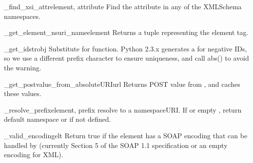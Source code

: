 \begin{funcdesc}{_find_xsi_attr}{element, attribute}
Find the attribute in any of the XMLSchema namespaces.
\end{funcdesc}

\begin{funcdesc}{_get_element_nsuri_name}{element}
Returns a  tuple representing the element tag.
\end{funcdesc}

\begin{funcdesc}{_get_idstr}{obj}
Substitute for  function.  Python 2.3.x generates a  for negative
IDs, so we use a different prefix character to ensure uniqueness, and call abs()
to avoid the warning.
\end{funcdesc}

\begin{funcdesc}{_get_postvalue_from_absoluteURI}{url}
Returns POST value from , and caches these values.
\end{funcdesc}

\begin{funcdesc}{_resolve_prefix}{element, prefix}
 resolve  to a namespaceURI.  If  or empty ,
 return default namespace or  if not defined.
\end{funcdesc}

\begin{funcdesc}{_valid_encoding}{elt}
Return true if the element  has a SOAP encoding
that can be handled by \ZSI{}
(currently Section 5 of the SOAP 1.1 specification or an empty encoding
for XML).
\end{funcdesc}
